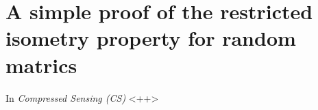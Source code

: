 \chapter{A simple proof of the restricted isometry property for random matrics}
In \emph{\textcolor[rgb]{1,0,0}{Compressed Sensing (CS)}} \cite{Candes2006,}<++>

